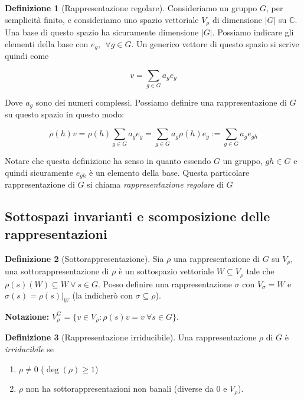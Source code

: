 \documentclass[11pt]{article}
\theoremstyle{plain}
\theoremstyle{definition}
\newtheorem{defn}{Definizione}[section]
\theoremstyle{remark}
\newcommand{\C}{\mathbb{C}}
\newcommand{\dsum}{\displaystyle\sum}
\begin{document}
\begin{defn}[Rappresentazione regolare]
  Consideriamo un gruppo $G$, per semplicità finito, e consideriamo uno spazio vettoriale $V_\rho$ di dimensione $|G|$ su $\C$. Una base di questo spazio ha sicuramente dimensione $|G|$. Possiamo indicare gli elementi della base con $e_g, \ \ \forall g \in G$. Un generico vettore di questo spazio si scrive quindi come

  \[ v = \dsum_{g \in G} a_g e_g \]

  Dove $a_g$ sono dei numeri complessi. Possiamo definire una rappresentazione di $G$ su questo spazio in questo modo:

  \[ \rho(h)v = \rho(h) \dsum_{g \in G} a_g e_g = \dsum_{g\in G} a_g \rho(h) e_g := \dsum_{g \in G} a_g e_{gh} \]

  Notare che questa definizione ha senso in quanto essendo $G$ un gruppo, $gh \in G$ e quindi sicuramente $e_{gh}$ è un elemento della base. Questa particolare rappresentazione di $G$ si chiama \emph{rappresentazione regolare} di $G$


  
  \label{defn:rappresentazione regolare}
\end{defn}



\subsection{Sottospazi invarianti e scomposizione delle rappresentazioni}



\begin{defn}[Sottorappresentazione]
Sia $\rho$ una rappresentazione di $G$ su $V_{\rho}$, una sottorappresentazione di $\rho$ è un sottospazio vettoriale $W\subseteq V_{\rho}$ tale che $\rho(s)(W)\subseteq W\ \forall\ s\in G$. Posso definire una rappresentazione $\sigma$ con $V_{\sigma}=W$ e $\sigma(s)=\rho(s)|_W$ (la indicherò con $\sigma\subseteq \rho$).
\end{defn}

\textbf{Notazione:} $V_{\rho}^G=\{v\in V_{\rho}: \rho(s)v=v\ \forall s\in G\}$.


\begin{defn}[Rappresentazione irriducibile]
Una rappresentazione $\rho$ di $G$ è \textit{irriducibile} se
\begin{enumerate}
	\item $\rho \neq 0$ ($\deg(\rho) \geq 1$)
	\item $\rho$ non ha sottorappresentazioni non banali (diverse da 0 e $V_{\rho}$).
\end{enumerate}

\end{defn}
\end{document}
